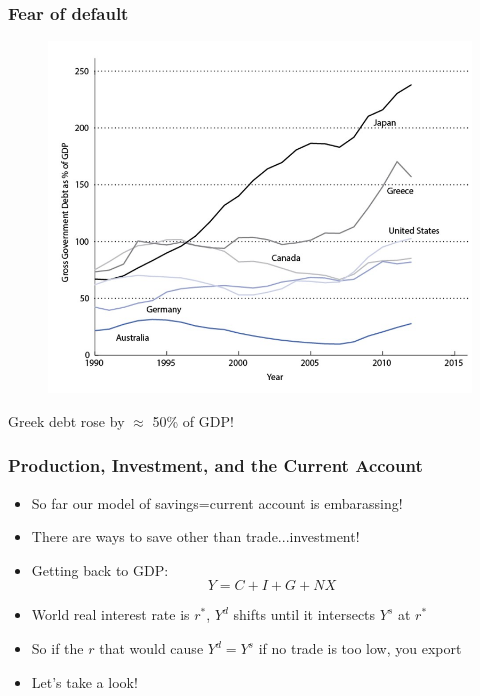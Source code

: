\documentclass{beamer}
\begin{document}
\begin{frame}
\frametitle[alignment=center]{Fear of default}
\begin{figure}
\centering
\includegraphics[scale=0.55]{Figures/W_Fig_16pt6.png}
\end{figure}
Greek debt rose by $\approx$ 50\% of GDP!
\end{frame}



\begin{frame}
\frametitle[alignment=center]{Production, Investment, and the Current Account}
\begin{itemize}
\item So far our model of savings=current account is embarassing!
\bigskip
\item There are ways to save other than trade...investment!
\bigskip
\item Getting back to GDP:
$$Y=C+I+G+NX$$
\item World real interest rate is $r^*$, $Y^d$ shifts until it intersects $Y^s$ at $r^*$
\bigskip
\item So if the $r$ that would cause $Y^d=Y^s$ if no trade is too low, you export
\bigskip
\item Let's take a look!
\end{itemize}
\end{frame}
\end{document}
